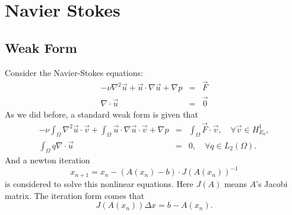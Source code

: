 \documentclass[a4paper]{article}
\begin{document}
\section{Navier Stokes}
\subsection{Weak Form}
Consider the Navier-Stokes equations:
\begin{equation}
\begin{array}{rcl}
-\nu \nabla^2 \vec{u} + \vec{u}\cdot \nabla \vec{u} + \nabla p &=& \vec{F} \\
\nabla \cdot \vec{u} &=& \vec{0}
\label{eq::Navier-Stokes-problem}
\end{array}
\end{equation}
As we did before, a standard weak form is given that
\begin{equation}
\begin{array}{rcl}
-\nu\int_\Omega \nabla^2 \vec{u} \cdot
\vec{v} + \int_{\Omega} \vec{u} \cdot \nabla \vec{u} \cdot \vec{v} + \nabla p
& = & \int_{\Omega} \vec{F} \cdot \vec{v}, \quad \forall \vec{v} \in
H^1_{E_0}, \\ \int_\Omega q \nabla \cdot \vec{u} & = & 0, \quad \forall q
\in L_2(\Omega).
\label{eq::Navier-Stokes-weakform}
\end{array}
\end{equation}
And a newton iteration
$$
x_{n+1} = x_{n} - (A(x_n)-b) \cdot J(A(x_{n}))^{-1}
$$ is considered to solve this nonlinear equations. Here $J(A)$ means
$A$'s Jacobi matrix. The iteration form comes that
$$
J(A(x_n))\Delta x = b - A(x_n).
$$

\end{document}
